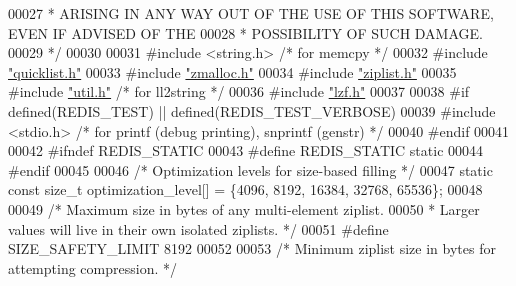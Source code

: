 \begin{DoxyCode}
00027 \textcolor{comment}{ * ARISING IN ANY WAY OUT OF THE USE OF THIS SOFTWARE, EVEN IF ADVISED OF THE}
00028 \textcolor{comment}{ * POSSIBILITY OF SUCH DAMAGE.}
00029 \textcolor{comment}{ */}
00030 
00031 \textcolor{preprocessor}{#}\textcolor{preprocessor}{include} \textcolor{preprocessor}{<}\textcolor{preprocessor}{string}\textcolor{preprocessor}{.}\textcolor{preprocessor}{h}\textcolor{preprocessor}{>} \textcolor{comment}{/* for memcpy */}
00032 \textcolor{preprocessor}{#}\textcolor{preprocessor}{include} \hyperlink{quicklist_8h}{"quicklist.h"}
00033 \textcolor{preprocessor}{#}\textcolor{preprocessor}{include} \hyperlink{zmalloc_8h}{"zmalloc.h"}
00034 \textcolor{preprocessor}{#}\textcolor{preprocessor}{include} \hyperlink{ziplist_8h}{"ziplist.h"}
00035 \textcolor{preprocessor}{#}\textcolor{preprocessor}{include} \hyperlink{util_8h}{"util.h"}         \textcolor{comment}{/* for ll2string */}
00036 \textcolor{preprocessor}{#}\textcolor{preprocessor}{include} \hyperlink{lzf_8h}{"lzf.h"}
00037 
00038 \textcolor{preprocessor}{#}\textcolor{preprocessor}{if} \textcolor{preprocessor}{defined}\textcolor{preprocessor}{(}\textcolor{preprocessor}{REDIS\_TEST}\textcolor{preprocessor}{)} \textcolor{preprocessor}{||} \textcolor{preprocessor}{defined}\textcolor{preprocessor}{(}\textcolor{preprocessor}{REDIS\_TEST\_VERBOSE}\textcolor{preprocessor}{)}
00039 \textcolor{preprocessor}{#}\textcolor{preprocessor}{include} \textcolor{preprocessor}{<}\textcolor{preprocessor}{stdio}\textcolor{preprocessor}{.}\textcolor{preprocessor}{h}\textcolor{preprocessor}{>} \textcolor{comment}{/* for printf (debug printing), snprintf (genstr) */}
00040 \textcolor{preprocessor}{#}\textcolor{preprocessor}{endif}
00041 
00042 \textcolor{preprocessor}{#}\textcolor{preprocessor}{ifndef} \textcolor{preprocessor}{REDIS\_STATIC}
00043 \textcolor{preprocessor}{#}\textcolor{preprocessor}{define} \textcolor{preprocessor}{REDIS\_STATIC} \textcolor{keyword}{static}
00044 \textcolor{preprocessor}{#}\textcolor{preprocessor}{endif}
00045 
00046 \textcolor{comment}{/* Optimization levels for size-based filling */}
00047 \textcolor{keyword}{static} \textcolor{keyword}{const} size\_t optimization\_level[] = \{4096, 8192, 16384, 32768, 65536\};
00048 
00049 \textcolor{comment}{/* Maximum size in bytes of any multi-element ziplist.}
00050 \textcolor{comment}{ * Larger values will live in their own isolated ziplists. */}
00051 \textcolor{preprocessor}{#}\textcolor{preprocessor}{define} \textcolor{preprocessor}{SIZE\_SAFETY\_LIMIT} 8192
00052 
00053 \textcolor{comment}{/* Minimum ziplist size in bytes for attempting compression. */}

\end{DoxyCode}
